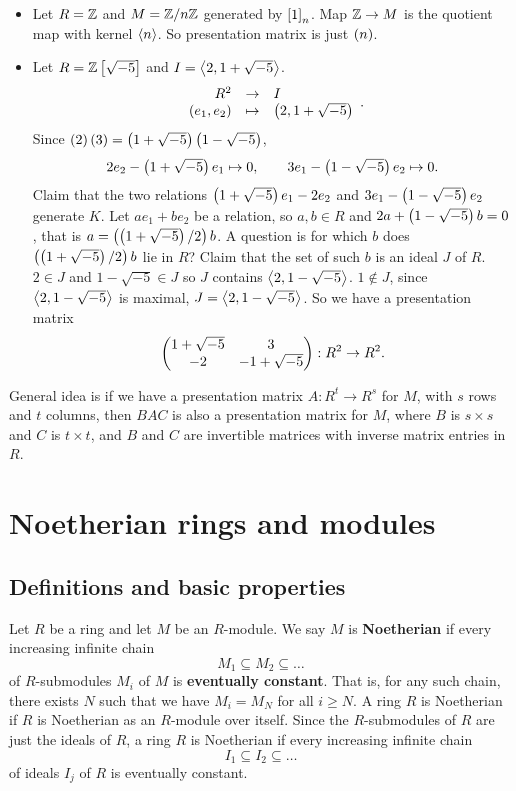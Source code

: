 \begin{example*}
\hfill
\begin{itemize}
\item Let $ R = \Z $ and $ M = \Z / n\Z $ generated by $ \sb{1}_n $. Map $ \Z \to M $ is the quotient map with kernel $ \ab{n} $. So presentation matrix is just $ \rb{n} $.
\item Let $ R = \Z\sb{\sqrt{-5}} $ and $ I = \ab{2, 1 + \sqrt{-5}} $.
$$ \function{R^2}{I}{\rb{e_1, e_2}}{\rb{2, 1 + \sqrt{-5}}}. $$
Since $ \rb{2}\rb{3} = \rb{1 + \sqrt{-5}}\rb{1 - \sqrt{-5}} $,
$$ 2e_2 - \rb{1 + \sqrt{-5}}e_1 \mapsto 0, \qquad 3e_1 - \rb{1 - \sqrt{-5}}e_2 \mapsto 0. $$
Claim that the two relations $ \rb{1 + \sqrt{-5}}e_1 - 2e_2 $ and $ 3e_1 - \rb{1 - \sqrt{-5}}e_2 $ generate $ K $. Let $ ae_1 + be_2 $ be a relation, so $ a, b \in R $ and $ 2a + \rb{1 - \sqrt{-5}}b = 0 $, that is $ a = \rb{\rb{1 + \sqrt{-5}} / 2}b $. A question is for which $ b $ does $ \rb{\rb{1 + \sqrt{-5}} / 2}b $ lie in $ R $? Claim that the set of such $ b $ is an ideal $ J $ of $ R $. $ 2 \in J $ and $ 1 - \sqrt{-5} \in J $ so $ J $ contains $ \ab{2, 1 - \sqrt{-5}} $. $ 1 \notin J $, since $ \ab{2, 1 - \sqrt{-5}} $ is maximal, $ J = \ab{2, 1 - \sqrt{-5}} $. So we have a presentation matrix
$$ \twobytwo{1 + \sqrt{-5}}{3}{-2}{-1 + \sqrt{-5}} : R^2 \to R^2. $$
\end{itemize}
\end{example*}

General idea is if we have a presentation matrix $ A : R^t \to R^s $ for $ M $, with $ s $ rows and $ t $ columns, then $ BAC $ is also a presentation matrix for $ M $, where $ B $ is $ s \times s $ and $ C $ is $ t \times t $, and $ B $ and $ C $ are invertible matrices with inverse matrix entries in $ R $.

\pagebreak

\section{Noetherian rings and modules}

\subsection{Definitions and basic properties}

\begin{definition}
Let $ R $ be a ring and let $ M $ be an $ R $-module. We say $ M $ is \textbf{Noetherian} if every increasing infinite chain
$$ M_1 \subseteq M_2 \subseteq \dots $$
of $ R $-submodules $ M_i $ of $ M $ is \textbf{eventually constant}. That is, for any such chain, there exists $ N $ such that we have $ M_i = M_N $ for all $ i \ge N $. A ring $ R $ is Noetherian if $ R $ is Noetherian as an $ R $-module over itself. Since the $ R $-submodules of $ R $ are just the ideals of $ R $, a ring $ R $ is Noetherian if every increasing infinite chain
$$ I_1 \subseteq I_2 \subseteq \dots $$
of ideals $ I_j $ of $ R $ is eventually constant.
\end{definition}

